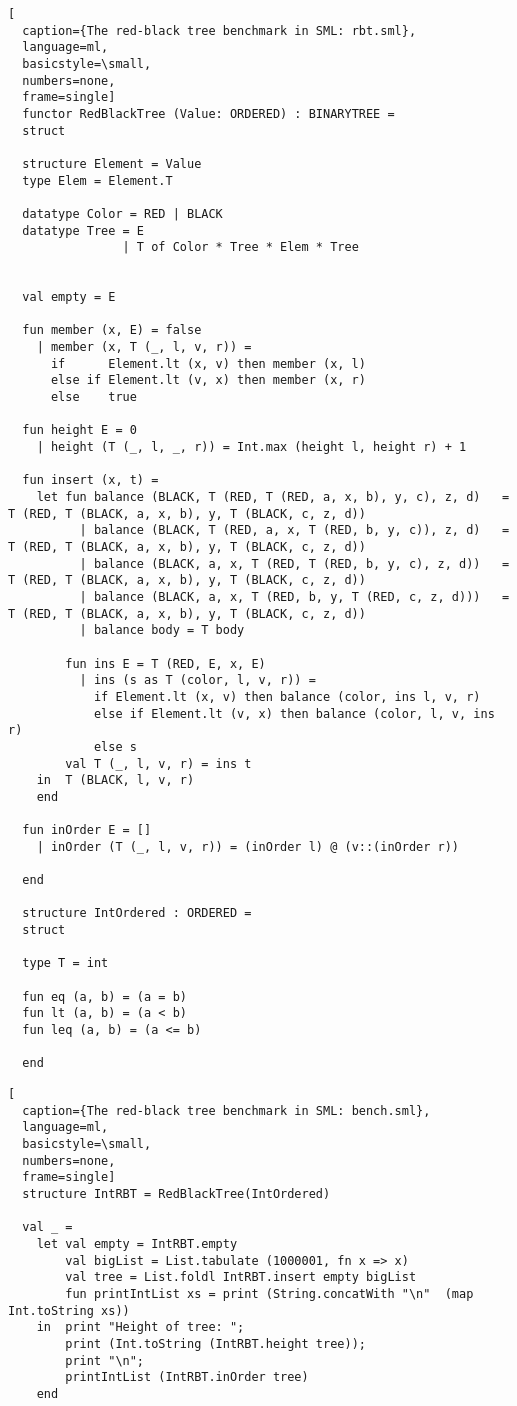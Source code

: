 \begin{lstlisting}[
  caption={The red-black tree benchmark in SML: rbt.sml},
  language=ml,
  basicstyle=\small,
  numbers=none,
  frame=single]
  functor RedBlackTree (Value: ORDERED) : BINARYTREE =
  struct

  structure Element = Value
  type Elem = Element.T
                        
  datatype Color = RED | BLACK
  datatype Tree = E
                | T of Color * Tree * Elem * Tree


  val empty = E

  fun member (x, E) = false
    | member (x, T (_, l, v, r)) =
      if      Element.lt (x, v) then member (x, l)
      else if Element.lt (v, x) then member (x, r)
      else    true

  fun height E = 0
    | height (T (_, l, _, r)) = Int.max (height l, height r) + 1
  
  fun insert (x, t) =
    let fun balance (BLACK, T (RED, T (RED, a, x, b), y, c), z, d)   = T (RED, T (BLACK, a, x, b), y, T (BLACK, c, z, d))
          | balance (BLACK, T (RED, a, x, T (RED, b, y, c)), z, d)   = T (RED, T (BLACK, a, x, b), y, T (BLACK, c, z, d))
          | balance (BLACK, a, x, T (RED, T (RED, b, y, c), z, d))   = T (RED, T (BLACK, a, x, b), y, T (BLACK, c, z, d))
          | balance (BLACK, a, x, T (RED, b, y, T (RED, c, z, d)))   = T (RED, T (BLACK, a, x, b), y, T (BLACK, c, z, d))
          | balance body = T body
                           
        fun ins E = T (RED, E, x, E)
          | ins (s as T (color, l, v, r)) =
            if Element.lt (x, v) then balance (color, ins l, v, r)
            else if Element.lt (v, x) then balance (color, l, v, ins r)
            else s
        val T (_, l, v, r) = ins t  
    in  T (BLACK, l, v, r)
    end

  fun inOrder E = []
    | inOrder (T (_, l, v, r)) = (inOrder l) @ (v::(inOrder r))

  end

  structure IntOrdered : ORDERED =
  struct

  type T = int

  fun eq (a, b) = (a = b)
  fun lt (a, b) = (a < b)
  fun leq (a, b) = (a <= b)

  end

\end{lstlisting}

\begin{lstlisting}[
  caption={The red-black tree benchmark in SML: bench.sml},
  language=ml,
  basicstyle=\small,
  numbers=none,
  frame=single] 
  structure IntRBT = RedBlackTree(IntOrdered)
                 
  val _ =
    let val empty = IntRBT.empty
        val bigList = List.tabulate (1000001, fn x => x)
        val tree = List.foldl IntRBT.insert empty bigList
        fun printIntList xs = print (String.concatWith "\n"  (map Int.toString xs))
    in  print "Height of tree: ";
        print (Int.toString (IntRBT.height tree));
        print "\n";
        printIntList (IntRBT.inOrder tree)
    end
\end{lstlisting}

